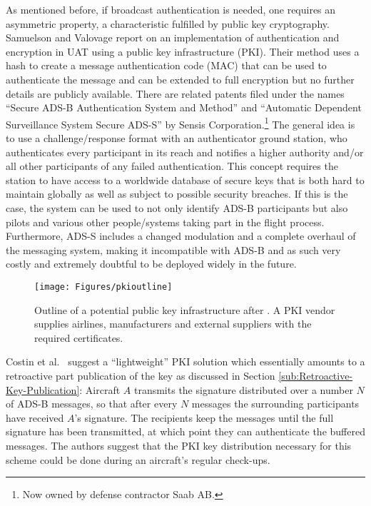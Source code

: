 \documentclass[english]{IEEEtran}
\begin{document}
As mentioned before, if broadcast authentication is needed, one requires
an asymmetric property, a characteristic fulfilled by public key cryptography.
Samuelson and Valovage \cite{Samuelson2006} report on an implementation
of authentication and encryption in UAT using a public key infrastructure
(PKI). Their method uses a hash to create a message authentication
code (MAC) that can be used to authenticate the message and can be
extended to full encryption but no further details are publicly available.
There are related patents filed under the names ``Secure ADS-B Authentication
System and Method'' \cite{viggiano2010secure} and ``Automatic Dependent
Surveillance System Secure ADS-S'' \cite{schuchman2011automatic}
by Sensis Corporation.\footnote{Now owned by defense contractor Saab AB.} The general idea is to use a challenge/response format with an authenticator
ground station, who authenticates every participant in its reach and
notifies a higher authority and/or all other participants of any failed
authentication. This concept requires the station to have access to
a worldwide database of secure keys that is both hard to maintain
globally as well as subject to possible security breaches. If this
is the case, the system can be used to not only identify ADS-B participants
but also pilots and various other people/systems taking part in the
flight process. Furthermore, ADS-S includes a changed modulation and
a complete overhaul of the messaging system, making it incompatible
with ADS-B and as such very costly and extremely doubtful to be deployed
widely in the future.
\begin{figure}
\texttt{[image: Figures/pkioutline]}\caption{Outline of a potential public key infrastructure after \cite{Robinson2007}.
A PKI vendor supplies airlines, manufacturers and external suppliers
with the required certificates. \label{fig:Outline-of-aPKI} }
\end{figure}


Costin et al.~\cite{Costin} suggest a ``lightweight'' PKI solution
which essentially amounts to a retroactive part publication of the
key as discussed in Section \ref{sub:Retroactive-Key-Publication}:
Aircraft $A$ transmits the signature distributed over a number $N$
of ADS-B messages, so that after every $N$ messages the surrounding
participants have received $A$'s signature. The recipients keep the
messages until the full signature has been transmitted, at which point
they can authenticate the buffered messages.\emph{ }The authors suggest
that the PKI key distribution necessary for this scheme could be done
during an aircraft's regular check-ups. 
\end{document}
